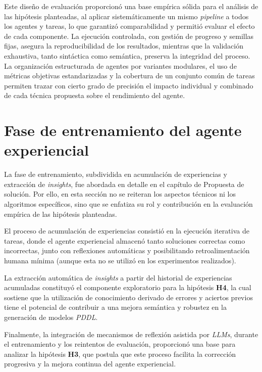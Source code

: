 Este diseño de evaluación proporcionó una base empírica sólida para el análisis de las hipótesis planteadas, al aplicar sistemáticamente un mismo \textit{pipeline} a todos los agentes y tareas, lo que garantizó comparabilidad y permitió evaluar el efecto de cada componente. La ejecución controlada, con gestión de progreso y semillas fijas, asegura la reproducibilidad de los resultados, mientras que la validación exhaustiva, tanto sintáctica como semántica, preserva la integridad del proceso. La organización estructurada de agentes por variantes modulares, el uso de métricas objetivas estandarizadas y la cobertura de un conjunto común de tareas permiten trazar con cierto grado de precisión el impacto individual y combinado de cada técnica propuesta sobre el rendimiento del agente.

\section{Fase de entrenamiento del agente experiencial}

La fase de entrenamiento, subdividida en acumulación de experiencias y extracción de \textit{insights}, fue abordada en detalle en el capítulo de Propuesta de solución. Por ello, en esta sección no se reiteran los aspectos técnicos ni los algoritmos específicos, sino que se enfatiza su rol y contribución en la evaluación empírica de las hipótesis planteadas.

El proceso de acumulación de experiencias consistió en la ejecución iterativa de tareas, donde el agente experiencial almacenó tanto soluciones correctas como incorrectas, junto con reflexiones automáticas y posibilitando retroalimentación humana mínima (aunque esta no se utilizó en los experimentos realizados).

La extracción automática de \textit{insights} a partir del historial de experiencias acumuladas constituyó el componente exploratorio para la hipótesis \textbf{H4}, la cual sostiene que la utilización de conocimiento derivado de errores y aciertos previos tiene el potencial de contribuir a una mejora semántica y robustez en la generación de modelos \textit{PDDL}.

Finalmente, la integración de mecanismos de reflexión asistida por \textit{LLMs}, durante el entrenamiento y los reintentos de evaluación, proporcionó una base para analizar la hipótesis \textbf{H3}, que postula que este proceso facilita la corrección progresiva y la mejora continua del agente experiencial.

